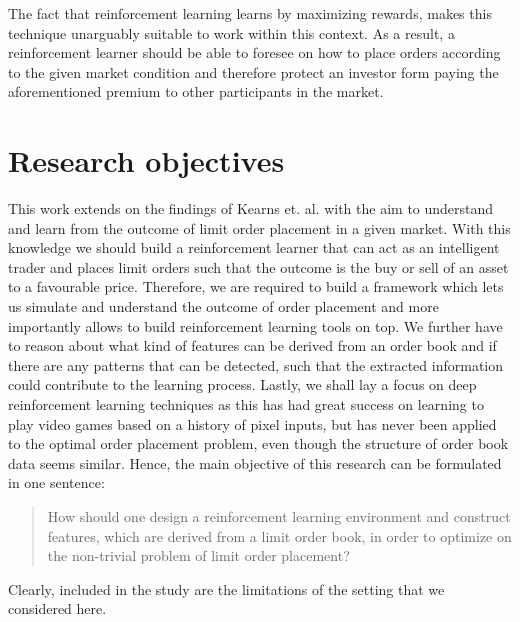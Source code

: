 %

The fact that reinforcement learning learns by maximizing rewards, makes this technique unarguably suitable to work within this context.
As a result, a reinforcement learner should be able to foresee on how to place orders according to the given market condition and therefore protect an investor form paying the aforementioned premium to other participants in the market.

\section{Research objectives}

This work extends on the findings of Kearns et. al. \cite{nevmyvaka2006reinforcement} with the aim to understand and learn from the outcome of limit order placement in a given market.
With this knowledge we should build a reinforcement learner that can act as an intelligent trader and places limit orders such that the outcome is the buy or sell of an asset to a favourable price.
Therefore, we are required to build a framework which lets us simulate and understand the outcome of order placement and more importantly allows to build reinforcement learning tools on top.
We further have to reason about what kind of features can be derived from an order book and if there are any patterns that can be detected, such that the extracted information could contribute to the learning process.
Lastly, we shall lay a focus on deep reinforcement learning techniques as this has had great success on learning to play video games \cite{mnih2013playing} based on a history of pixel inputs, but has never been applied to the optimal order placement problem, even though the structure of order book data seems similar.
Hence, the main objective of this research can be formulated in one sentence: \begin{quote}
    How should one design a reinforcement learning environment and construct features, which are derived from a limit order book, in order to optimize on the non-trivial problem of limit order placement?
\end{quote}
Clearly, included in the study are the limitations of the setting that we considered here.


